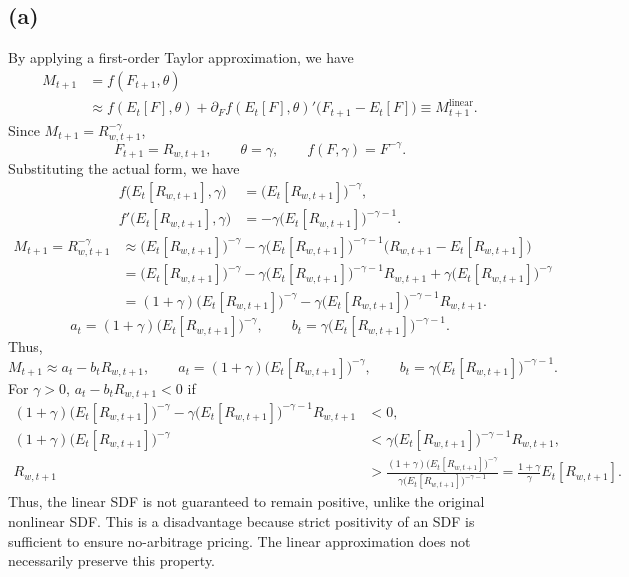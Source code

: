 \documentclass[11pt]{article}
\begin{document}
\subsection*{(a)}

By applying a first-order Taylor approximation, we have
\begin{align*}
M_{t+1}
&=f(F_{t+1},\theta) \\
&\approx f(E_t[F],\theta)
+\partial_F f(E_t[F],\theta)'\bigl(F_{t+1}-E_t[F]\bigr)
\equiv M_{t+1}^{\mathrm{linear}}.
\end{align*}
Since $M_{t+1}=R_{w,t+1}^{-\gamma}$,
\[
F_{t+1}=R_{w,t+1},\qquad \theta=\gamma,\qquad
f(F,\gamma)=F^{-\gamma}.
\]
Substituting the actual form, we have
\begin{align*}
f\bigl(E_t[R_{w,t+1}],\gamma\bigr)
&=\bigl(E_t[R_{w,t+1}]\bigr)^{-\gamma}, \\
f'\bigl(E_t[R_{w,t+1}],\gamma\bigr)
&=-\gamma\bigl(E_t[R_{w,t+1}]\bigr)^{-\gamma-1}.
\end{align*}
\begin{align*}
M_{t+1}=R_{w,t+1}^{-\gamma}
&\approx \bigl(E_t[R_{w,t+1}]\bigr)^{-\gamma}
-\gamma\bigl(E_t[R_{w,t+1}]\bigr)^{-\gamma-1}
\bigl(R_{w,t+1}-E_t[R_{w,t+1}]\bigr) \\
&=\bigl(E_t[R_{w,t+1}]\bigr)^{-\gamma}
-\gamma\bigl(E_t[R_{w,t+1}]\bigr)^{-\gamma-1}R_{w,t+1}
+\gamma\bigl(E_t[R_{w,t+1}]\bigr)^{-\gamma} \\
&=(1+\gamma)\bigl(E_t[R_{w,t+1}]\bigr)^{-\gamma}
-\gamma\bigl(E_t[R_{w,t+1}]\bigr)^{-\gamma-1}R_{w,t+1}.
\end{align*}
\[
a_t=(1+\gamma)\bigl(E_t[R_{w,t+1}]\bigr)^{-\gamma},
\qquad
b_t=\gamma\bigl(E_t[R_{w,t+1}]\bigr)^{-\gamma-1}.
\]
Thus,
\[
M_{t+1}\approx a_t-b_tR_{w,t+1},\qquad
a_t=(1+\gamma)\bigl(E_t[R_{w,t+1}]\bigr)^{-\gamma},\qquad
b_t=\gamma\bigl(E_t[R_{w,t+1}]\bigr)^{-\gamma-1}.
\]
For $\gamma>0$, $a_t-b_tR_{w,t+1}<0$ if
\begin{align*}
(1+\gamma)\bigl(E_t[R_{w,t+1}]\bigr)^{-\gamma}
-\gamma\bigl(E_t[R_{w,t+1}]\bigr)^{-\gamma-1}R_{w,t+1}&<0, \\
(1+\gamma)\bigl(E_t[R_{w,t+1}]\bigr)^{-\gamma}
&<\gamma\bigl(E_t[R_{w,t+1}]\bigr)^{-\gamma-1}R_{w,t+1}, \\
R_{w,t+1}
&>\frac{(1+\gamma)\bigl(E_t[R_{w,t+1}]\bigr)^{-\gamma}}
{\gamma\bigl(E_t[R_{w,t+1}]\bigr)^{-\gamma-1}}
=\frac{1+\gamma}{\gamma}E_t[R_{w,t+1}].
\end{align*}
Thus, the linear SDF is not guaranteed to remain positive, unlike the original
nonlinear SDF. This is a disadvantage because strict positivity of an SDF is
sufficient to ensure no-arbitrage pricing. The linear approximation does not
necessarily preserve this property.
\end{document}
